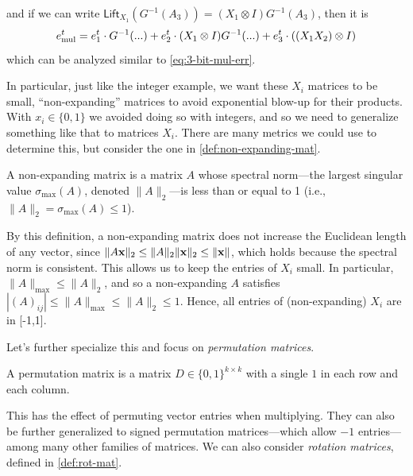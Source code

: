 \documentclass[11pt]{article}
\begin{document}
\noindent and if we can write $\mathsf{Lift}_{X_1}(G^{-1}(A_3)) = (X_1 \otimes I)G^{-1}(A_3)$, then it is
\begin{equation}
    \label{eq:mat-mul-err2}
    e_{\textmd{mul}}^t
    =
    e_1^t \cdot G^{-1}(...) + e_2^t \cdot (X_1 \otimes I)G^{-1}(...) + e_3^t\cdot ((X_1X_2) \otimes I)
\end{equation}
\noindent which can be analyzed similar to \cref{eq:3-bit-mul-err}.

In particular, just like the integer example, we want these $X_i$ matrices to be small, ``non-expanding'' matrices to avoid exponential blow-up for their products. With $x_i \in \{0,1\}$ we avoided doing so with integers, and so we need to generalize something like that to matrices $X_i$. There are many metrics we could use to determine this, but consider the one in \cref{def:non-expanding-mat}.

\begin{definition}
    \label{def:non-expanding-mat}
    A non-expanding matrix is a matrix $A$ whose spectral norm---the largest singular value $\sigma_{\max}(A)$, denoted $\|A\|_2$---is less than or equal to 1 (i.e., $\|A\|_2 = \sigma_{\max}(A) \leq 1$).
\end{definition}

\noindent By this definition, a non-expanding matrix does not increase the Euclidean length of any vector, since $\|A\mathbf{x}\|_2 \leq \|A\|_2\|\mathbf{x}\|_2 \leq \|\mathbf{x}\|$, which holds because the spectral norm is consistent. This allows us to keep the entries of $X_i$ small. In particular, $\|A\|_{\max} \leq \|A\|_2$, and so a non-expanding $A$ satisfies $|(A)_{ij}| \leq \|A\|_{\max} \leq \|A\|_2 \leq 1$. Hence, all entries of (non-expanding) $X_i$ are in [-1,1].

Let's further specialize this and focus on \emph{permutation matrices}.

\begin{definition}
    A permutation matrix is a matrix $D \in \{0,1\}^{k \times k}$ with a single $1$ in each row and each column.
\end{definition}

\noindent This has the effect of permuting vector entries when multiplying. They can also be further generalized to signed permutation matrices---which allow $-1$ entries---among many other families of matrices. We can also consider \emph{rotation matrices}, defined in \cref{def:rot-mat}.
\end{document}
